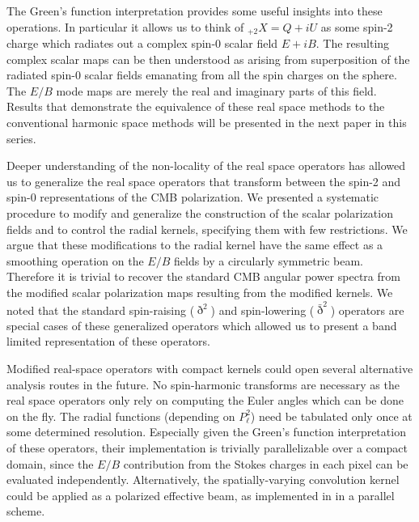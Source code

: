 \documentclass[a4paper,11pt]{article}
\begin{document}
The Green's function interpretation provides some useful insights into these operations. In particular it allows us to think of ${}_{+2}X=Q+iU$ as some spin-2 charge which radiates out a complex spin-0 scalar field $E+iB$. The resulting complex scalar maps can be then understood as arising from superposition of the radiated spin-0 scalar fields emanating from all the spin charges on the sphere.  The $E/B$ mode maps are merely the real and imaginary parts of this field. Results that demonstrate the equivalence of these real space methods to the conventional harmonic space methods will be presented in the next paper in this series.

Deeper understanding of the non-locality of the real space operators has allowed us to generalize the real space operators that transform between the spin-2 and spin-0 representations of the CMB polarization. We presented a systematic procedure to modify and generalize the construction of the scalar polarization fields and to control the radial kernels, specifying them with few restrictions.  We argue that these modifications to the radial kernel have the same effect as a smoothing operation on the $E/B$ fields by a circularly symmetric beam.  Therefore it is trivial to recover the standard CMB angular power spectra from the modified scalar polarization maps resulting from the modified kernels.  We noted that the standard spin-raising ($\eth^2$) and spin-lowering ($\bar{\eth}^2$) operators are special cases of these generalized operators which allowed us to present a band limited representation of these operators. 

Modified real-space operators with compact kernels could open several alternative analysis routes in the future.  No spin-harmonic transforms are necessary as the real space operators only rely on computing the Euler angles which can be done on the fly.  The radial functions (depending on $P_{\ell}^{2}$) need be tabulated only once at some determined resolution.  Especially given the Green's function interpretation of these operators, their implementation is trivially parallelizable over a compact domain, since the $E/B$ contribution from the Stokes charges in each pixel can be evaluated independently.  Alternatively, the spatially-varying convolution kernel could be applied as a polarized effective beam, as implemented in \cite{2011ApJS..193....5M} in a parallel scheme.
\end{document}
